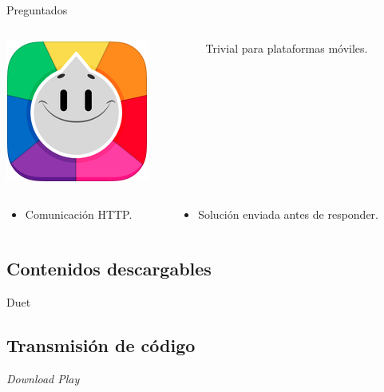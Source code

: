 \begin{frame}{Preguntados}
\begin{columns}
    \begin{column}{0.15\textwidth}
        \includegraphics[width=\textwidth,keepaspectratio]{imgs/preguntados_logo.png}
    \end{column}
    \begin{column}{0.85\textwidth}
        Trivial para plataformas móviles.
    \end{column}
\end{columns}

\begin{columns}
    \begin{column}{0.5\textwidth}
    \begin{itemize}
        \item<2-> Comunicación HTTP.
    \end{itemize}
    \end{column}

    \begin{column}{0.5\textwidth}
    \begin{itemize}
        \item<3-> Solución enviada antes de responder.
    \end{itemize}
    \end{column}
\end{columns}


\end{frame}

\subsection{Contenidos descargables}
\begin{frame}{Duet}

\end{frame}

\subsection{Transmisión de código}
\begin{frame}{\textit{Download Play}}

\end{frame}
